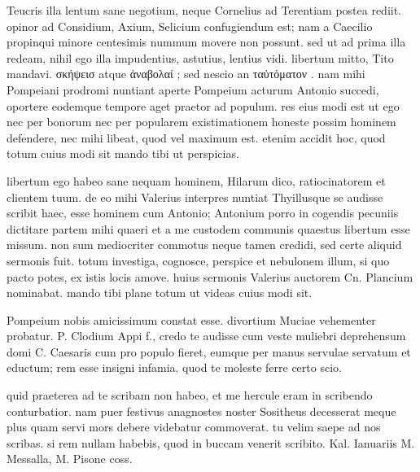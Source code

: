 


 Teucris illa lentum sane negotium, neque Cornelius ad Terentiam postea rediit. opinor ad Considium, Axium, Selicium confugiendum est; nam a Caecilio propinqui minore centesimis nummum movere non possunt. sed ut ad prima illa redeam, nihil ego illa impudentius, astutius, lentius vidi. libertum mitto, Tito mandavi. σκήψεισ atque ἀναβολαί ; sed nescio an ταὐτόματον . nam mihi Pompeiani prodromi nuntiant aperte Pompeium acturum Antonio succedi, oportere eodemque tempore aget praetor ad populum. res eius modi est ut ego nec per bonorum nec per popularem existimationem honeste possim hominem defendere, nec mihi libeat, quod vel maximum est. etenim accidit hoc, quod totum cuius modi sit mando tibi ut perspicias.

 libertum ego habeo sane nequam hominem, Hilarum dico, ratiocinatorem et clientem tuum. de eo mihi Valerius interpres nuntiat Thyillusque se audisse scribit haec, esse hominem cum Antonio; Antonium porro in cogendis pecuniis dictitare partem mihi quaeri et a me custodem communis quaestus libertum esse missum. non sum mediocriter commotus neque tamen credidi, sed certe aliquid sermonis fuit. totum investiga, cognosce, perspice et nebulonem illum, si quo pacto potes, ex istis locis amove. huius sermonis Valerius auctorem Cn. Plancium nominabat. mando tibi plane totum ut videas cuius modi sit.

 Pompeium nobis amicissimum constat esse. divortium Muciae vehementer probatur. P. Clodium Appi f., credo te audisse cum veste muliebri deprehensum domi C. Caesaris cum pro populo fieret, eumque per manus servulae servatum et eductum; rem esse insigni infamia. quod te moleste ferre certo scio.

 quid praeterea ad te scribam non habeo, et me hercule eram in scribendo conturbatior. nam puer festivus anagnostes noster Sositheus decesserat meque plus quam servi mors debere videbatur commoverat. tu velim saepe ad nos scribas. si rem nullam habebis, quod in buccam venerit scribito. Kal. Ianuariis M. Messalla, M. Pisone coss.
